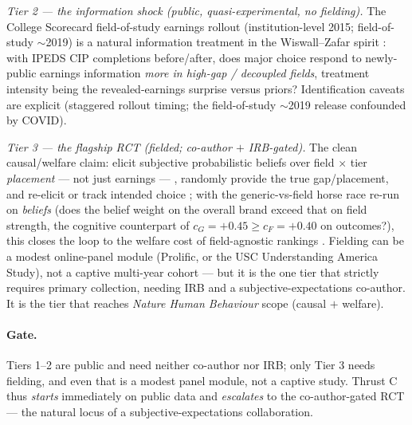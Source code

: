 \documentclass[11pt]{article}
\begin{document}
\emph{Tier 2 --- the information shock (public, quasi-experimental, no fielding).} The College Scorecard
field-of-study earnings rollout (institution-level 2015; field-of-study $\sim$2019) is a natural information
treatment in the Wiswall--Zafar spirit \citep{wiswall2015determinants}: with IPEDS CIP completions before/after,
does major choice respond to newly-public earnings information \emph{more in high-gap / decoupled fields}, treatment
intensity being the revealed-earnings surprise versus priors? Identification caveats are explicit (staggered rollout
timing; the field-of-study $\sim$2019 release confounded by COVID).

\emph{Tier 3 --- the flagship RCT (fielded; co-author $+$ IRB-gated).} The clean causal/welfare claim: elicit
subjective probabilistic beliefs over field $\times$ tier \emph{placement} --- not just earnings ---
\citep{manski2004measuring}, randomly provide the true gap/placement, and re-elicit or track intended choice
\citep{wiswall2015determinants}; with the generic-vs-field horse race re-run on \emph{beliefs} (does the belief
weight on the overall brand exceed that on field strength, the cognitive counterpart of $c_G=+0.45 \ge c_F=+0.40$
on outcomes?), this closes the loop to the welfare cost of field-agnostic rankings \citep{luca2013salience}.
Fielding can be a modest online-panel module (Prolific, or the USC Understanding America Study), not a captive
multi-year cohort --- but it is the one tier that strictly requires primary collection, needing IRB and a
subjective-expectations co-author. It is the tier that reaches \emph{Nature Human Behaviour} scope (causal $+$
welfare).

\paragraph{Gate.} Tiers 1--2 are public and need neither co-author nor IRB; only Tier 3 needs fielding, and even
that is a modest panel module, not a captive study. Thrust C thus \emph{starts} immediately on public data and
\emph{escalates} to the co-author-gated RCT --- the natural locus of a subjective-expectations collaboration.

\end{document}
